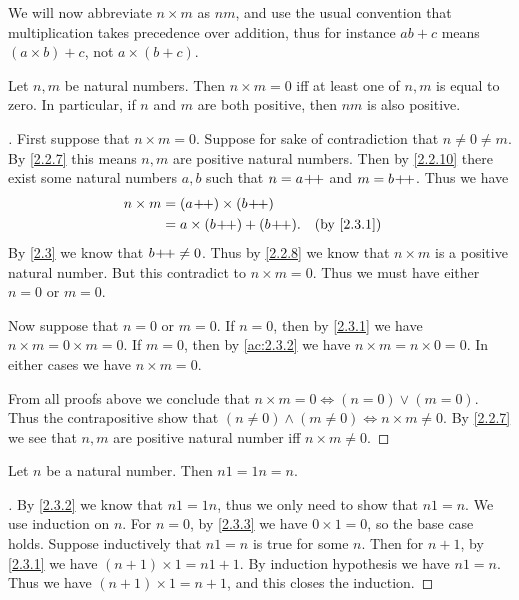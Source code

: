\begin{note}
  We will now abbreviate \(n \times m\) as \(nm\), and use the usual convention that multiplication takes precedence over addition, thus for instance \(ab + c\) means \((a \times b) + c\), not \(a \times (b + c)\).
\end{note}

\begin{lem}\label{2.3.3}
  Let \(n, m\) be natural numbers.
  Then \(n \times m = 0\) iff at least one of \(n, m\) is equal to zero.
  In particular, if \(n\) and \(m\) are both positive, then \(nm\) is also positive.
\end{lem}

\begin{proof}[]
  First suppose that \(n \times m = 0\).
  Suppose for sake of contradiction that \(n \neq 0 \neq m\).
  By \cref{2.2.7} this means \(n, m\) are positive natural numbers.
  Then by \cref{2.2.10} there exist some natural numbers \(a, b\) such that \(n = a\!+\!\!+\) and \(m = b\!+\!\!+\).
  Thus we have
  \begin{align*}
    n \times m & = (a\pp) \times (b\pp)                      \\
               & = a \times (b\pp) + (b\pp). &  & \by{2.3.1}
  \end{align*}
  By \cref{2.3} we know that \(b\!+\!\!+ \neq 0\).
  Thus by \cref{2.2.8} we know that \(n \times m\) is a positive natural number.
  But this contradict to \(n \times m = 0\).
  Thus we must have either \(n = 0\) or \(m = 0\).

  Now suppose that \(n = 0\) or \(m = 0\).
  If \(n = 0\), then by \cref{2.3.1} we have \(n \times m = 0 \times m = 0\).
  If \(m = 0\), then by \cref{ac:2.3.2} we have \(n \times m = n \times 0 = 0\).
  In either cases we have \(n \times m = 0\).

  From all proofs above we conclude that \(n \times m = 0 \iff (n = 0) \lor (m = 0)\).
  Thus the contrapositive show that \((n \neq 0) \land (m \neq 0) \iff n \times m \neq 0\).
  By \cref{2.2.7} we see that \(n, m\) are positive natural number iff \(n \times m \neq 0\).
\end{proof}

\begin{ac}\label{ac:2.3.4}
  Let \(n\) be a natural number.
  Then \(n1 = 1n = n\).
\end{ac}

\begin{proof}[]
  By \cref{2.3.2} we know that \(n1 = 1n\), thus we only need to show that \(n1 = n\).
  We use induction on \(n\).
  For \(n=0\), by \cref{2.3.3} we have \(0 \times 1 = 0\), so the base case holds.
  Suppose inductively that \(n1 = n\) is true for some \(n\).
  Then for \(n + 1\), by \cref{2.3.1} we have \((n + 1) \times 1 = n1 + 1\).
  By induction hypothesis we have \(n1 = n\).
  Thus we have \((n + 1) \times 1 = n + 1\), and this closes the induction.
\end{proof}

